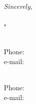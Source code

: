 \documentclass{letter}
\begin{document}
\begin{letter}









\vspace{1.5cm}
\textit{Sincerely,}

\begin{minipage}[t]{0.5\textwidth}
\vspace{1.5cm}
\textbf{\pApplicant,} \\
\textit{\pAddress} \\
\pCity \\
Phone: \pPhone \\
e-mail: \pEmail \\
\end{minipage}%
\begin{minipage}[t]{0.5\textwidth}
\vspace{1.5cm}
\begin{flushright}
\textbf{\dApplicant} \\
Phone: \dPhone \\
e-mail: \dEmail
\end{flushright}
\end{minipage}

\end{letter}
\end{document}
